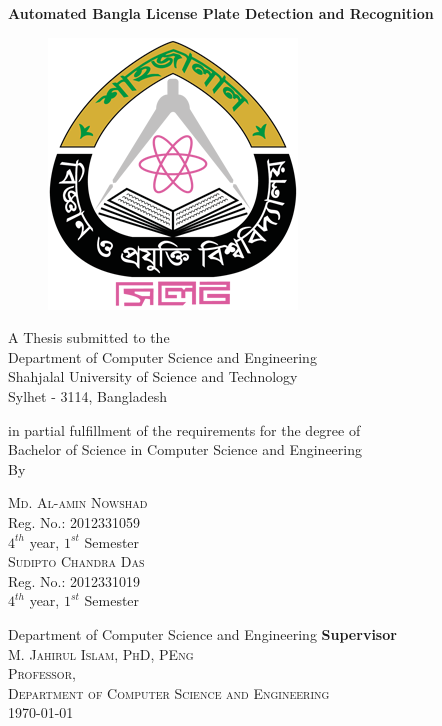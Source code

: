 \vspace{0.5cm}
{\Large \bf Automated Bangla License Plate Detection and Recognition} \\
\begin{figure}[h]
\centering
\includegraphics[scale=1.5]{./img/logo}
\end{figure}

\vspace{0.5cm}
A Thesis submitted to the \\
{\large Department of Computer Science and Engineering}\\
{\Large Shahjalal University of Science and Technology}\\
Sylhet - 3114, Bangladesh

in partial fulfillment of the requirements for the degree of \\
    
{\Large Bachelor of Science in Computer Science and Engineering}\\

\vfill {\LARGE By}\\
\begin{multicols}{2}
\textsc{\Large Md. Al-amin Nowshad }\\
Reg. No.: 2012331059\\ $4^{th}$ year, $1^{st}$ Semester\\
\textsc{\Large Sudipto Chandra Das} \\
Reg. No.: 2012331019\\ $4^{th}$ year, $1^{st}$ Semester\\ 
\end{multicols}

\vfill Department of Computer Science and Engineering
\vfill
{\bf Supervisor}\\
\textsc{\Large M. Jahirul Islam, PhD, PEng\\
Professor,\\
Department of Computer Science and Engineering} \\

\vfill
\today